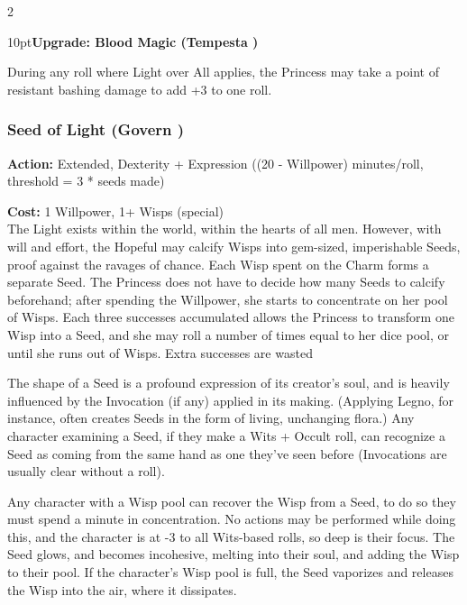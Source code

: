 \begin{multicols}{2}
\begin{myindentpar}{10pt}\textbf{Upgrade: Blood Magic (Tempesta \textbullet)}

During any roll where Light over All applies, the Princess may take a point of resistant bashing damage to add +3 to one roll.\end{myindentpar}


\subsubsection*{Seed of Light (Govern \textbullet\textbullet)}

\noindent \textbf{Action:} Extended, Dexterity + Expression ((20 - Willpower) minutes/roll, threshold = 3 * seeds made)

\noindent \textbf{Cost:} 1 Willpower, 1+ Wisps (special)\\

\noindent The Light exists within the world, within the hearts of all men. However, with will and effort, the Hopeful may calcify Wisps into gem-sized, imperishable Seeds, proof against the ravages of chance. Each Wisp spent on the Charm forms a separate Seed. The Princess does not have to decide how many Seeds to calcify beforehand; after spending the Willpower, she starts to concentrate on her pool of Wisps. Each three successes accumulated allows the Princess to transform one Wisp into a Seed, and she may roll a number of times equal to her dice pool, or until she runs out of Wisps. Extra successes are wasted

The shape of a Seed is a profound expression of its creator's soul, and is heavily influenced by the Invocation (if any) applied in its making. (Applying Legno, for instance, often creates Seeds in the form of living, unchanging flora.) Any character examining a Seed, if they make a Wits + Occult roll, can recognize a Seed as coming from the same hand as one they've seen before (Invocations are usually clear without a roll). 

Any character with a Wisp pool can recover the Wisp from a Seed, to do so they must spend a minute in concentration. No actions may be performed while doing this, and the character is at -3 to all Wits-based rolls, so deep is their focus. The Seed glows, and becomes incohesive, melting into their soul, and adding the Wisp to their pool. If the character's Wisp pool is full, the Seed vaporizes and releases the Wisp into the air, where it dissipates.


\end{multicols}
